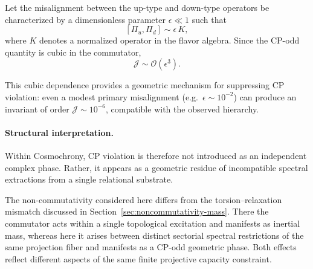     Let the misalignment between the up-type and down-type operators be
    characterized by a dimensionless parameter $\epsilon\ll1$ such that
    \[
      [\Pi_u,\Pi_d] \sim \epsilon\,K ,
    \]
    where $K$ denotes a normalized operator in the flavor algebra.
    Since the CP-odd quantity is cubic in the commutator,
    \begin{equation}
      \mathcal{J}
      \sim \mathcal{O}(\epsilon^3).
    \end{equation}

    This cubic dependence provides a geometric mechanism for suppressing
    CP violation: even a modest primary misalignment
    (e.g.\ $\epsilon\sim10^{-2}$) can produce an invariant of order
    $\mathcal{J}\sim10^{-6}$, compatible with the observed hierarchy.

  \paragraph{Structural interpretation.}

    Within Cosmochrony, CP violation is therefore not introduced as an
    independent complex phase.
    Rather, it appears as a geometric residue of incompatible spectral
    extractions from a single relational substrate.

    The non-commutativity considered here differs from the
    torsion–relaxation mismatch discussed in
    Section~\ref{sec:noncommutativity-mass}.
    There the commutator acts within a single topological excitation and
    manifests as inertial mass,
    whereas here it arises between distinct sectorial spectral
    restrictions of the same projection fiber and manifests as a
    CP-odd geometric phase.
    Both effects reflect different aspects of the same finite projective
    capacity constraint.
